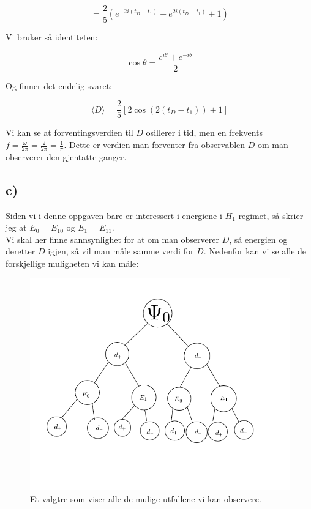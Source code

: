 \documentclass[a4paper,norsk, 10pt]{article}
\numberwithin{equation}{section}
\begin{document}
$$
= \frac{2}{5}\left(e^{-2i(t_D-t_1)} + e^{2i(t_D-t_1)} + 1\right)
$$

Vi bruker så identiteten:

$$
\cos \theta = \frac{e^{i\theta} + e^{-i\theta}}{2}
$$

Og finner det endelig svaret:

\begin{equation}
\langle D\rangle = \frac{2}{5}\left[2\cos(2(t_D - t_1)) + 1\right]
\end{equation}

Vi kan se at forventingsverdien til $D$ osillerer i tid, men en frekvents $f = \frac{\omega}{2\pi} = \frac{2}{2\pi} = \frac{1}{\pi}$. Dette er verdien man forventer fra observablen $D$ om man observerer den gjentatte ganger.

\subsection*{c)}

Siden vi i denne oppgaven bare er interessert i energiene i $H_1$-regimet, så skrier jeg at $E_0 = E_{10}$ og $E_1 = E_{11}$.\\

Vi skal her finne sannsynlighet for at om man observerer $D$, så energien og deretter $D$ igjen, så vil man måle samme verdi for $D$. Nedenfor kan vi se alle de forskjellige muligheten vi kan måle:

\begin{figure}[H]
\centering
\includegraphics[scale=0.6]{3c.png}
\caption{Et valgtre som viser alle de mulige utfallene vi kan observere.}
\end{figure}
\end{document}
